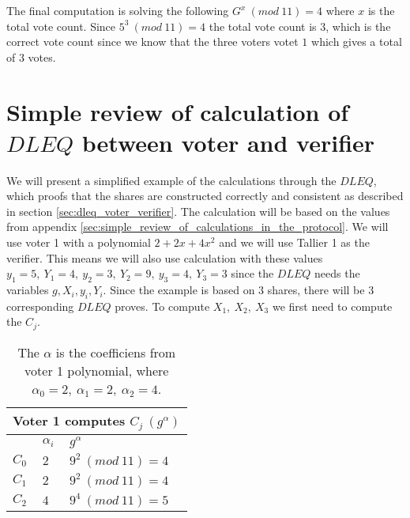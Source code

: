 \noindent
The final computation is solving the following $G^x \ (mod \ 11) = 4$	where $x$ is the total vote count. Since  $5^3 \  (mod \ 11) = 4$ the total vote count is $3$, which is the correct vote count since we know that the three voters votet $1$ which gives a total of $3$ votes.



\chapter{Simple review of calculation of $DLEQ$ between voter and verifier}
\label{sec:simple_review_of_calculation_of_dleq_between_voter_and_verifier}
We will present a simplified example of the calculations through the $DLEQ$, which proofs that the shares are constructed correctly and consistent as described in section \ref{sec:dleq_voter_verifier}.  The calculation will be based on the values  from appendix \ref{sec:simple_review_of_calculations_in_the_protocol}. We will use voter 1 with a polynomial $2+2x+4x^2$ and we will use Tallier 1 as the verifier. This means we will also  use calculation with these values $y_1 = 5, \ Y_1= 4, \ y_2 = 3, \ Y_2= 9, \ y_3 = 4, \ Y_3= 3$ since the $DLEQ$ needs the variables $g,X_i,y_i,Y_i$. Since the example is based on $3$ shares, there will be $3$ corresponding $DLEQ$ proves. To compute $X_1, \ X_2, \ X_3$ we first need to compute the $C_j$.



\begin{table}[H]
\centering
\begin{tabular}{|l|l|l|}
\hline
\multicolumn{3}{|l|}{\textbf{Voter 1 computes $C_j \ (g^{\alpha})$}} \\ \hline
              & $ \alpha_i $        & $g^{ \alpha }$              \\ \hline
$C_0$          & $2$               & $9^2 \ (mod \ 11) = 4$          \\ \hline
$C_1$          & $2$               & $9^2 \ (mod \ 11) = 4$          \\ \hline
$C_2$          & $4$               & $9^4 \ (mod \ 11) = 5$          \\ \hline
\end{tabular}
\caption{The $\alpha$ is the coefficiens from voter 1 polynomial, where $\alpha_0=2, \ \alpha_1= 2, \ \alpha_2= 4$. }
\label{my-label}
\end{table}


